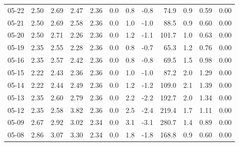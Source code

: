 \begin{threeparttable}
{\begin{tabular}{lrrrrrrrrrrr}
  05-22 &          2.50 &          2.69 &          2.47 &        2.36 &                 0.0 &                 0.8 &       -0.8 &                74.9 &              0.9 &            0.59 &                   0.00 \\
  05-21 &          2.50 &          2.69 &          2.58 &        2.36 &                 0.0 &                 1.0 &       -1.0 &                88.5 &              0.9 &            0.60 &                   0.00 \\
  05-20 &          2.50 &          2.71 &          2.26 &        2.36 &                 0.0 &                 1.2 &       -1.1 &               101.7 &              1.0 &            0.63 &                   0.00 \\
  05-19 &          2.35 &          2.55 &          2.28 &        2.36 &                 0.0 &                 0.8 &       -0.7 &                65.3 &              1.2 &            0.76 &                   0.00 \\
  05-16 &          2.35 &          2.57 &          2.42 &        2.36 &                 0.0 &                 0.8 &       -0.8 &                69.5 &              1.5 &            0.98 &                   0.00 \\
  05-15 &          2.22 &          2.43 &          2.36 &        2.36 &                 0.0 &                 1.0 &       -1.0 &                87.2 &              2.0 &            1.29 &                   0.00 \\
  05-14 &          2.22 &          2.44 &          2.49 &        2.36 &                 0.0 &                 1.2 &       -1.2 &               109.0 &              2.1 &            1.39 &                   0.00 \\
  05-13 &          2.35 &          2.60 &          2.79 &        2.36 &                 0.0 &                 2.2 &       -2.2 &               192.7 &              2.0 &            1.34 &                   0.00 \\
  05-12 &          2.35 &          2.58 &          3.82 &        2.36 &                 0.0 &                 2.5 &       -2.4 &               219.4 &              1.7 &            1.11 &                   0.00 \\
  05-09 &          2.67 &          2.92 &          3.02 &        2.34 &                 0.0 &                 3.1 &       -3.1 &               280.7 &              1.4 &            0.89 &                   0.00 \\
  05-08 &          2.86 &          3.07 &          3.30 &        2.34 &                 0.0 &                 1.8 &       -1.8 &               168.8 &              0.9 &            0.60 &                   0.00 \\

\end{tabular}}
\end{threeparttable}
